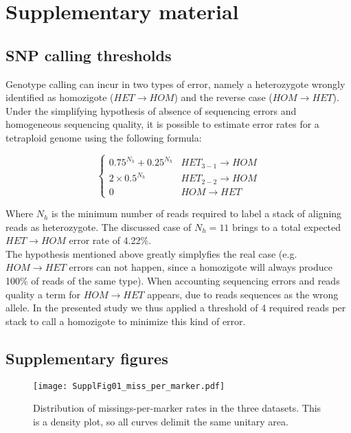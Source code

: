 \section{Supplementary material}
\label{sec:supplementary_material}

\subsection{SNP calling thresholds}
\label{sec:SNP_calling_thresholds}
Genotype calling can incur in two types of error, namely a heterozygote wrongly identified as homozigote ($HET \rightarrow HOM$) and the reverse case ($HOM \rightarrow HET$). 
Under the simplifying hypothesis of absence of sequencing errors and homogeneous sequencing quality, it is possible to estimate error rates for a tetraploid genome using the following formula:

\begin{equation}
\begin{cases}
0.75^{N_h} + 0.25^{N_h} & HET_{3-1} \rightarrow HOM \\ 
2 \times 0.5^{N_h}      & HET_{2-2} \rightarrow HOM \\ 
0                       & HOM \rightarrow HET
\end{cases}
\end{equation}

Where $N_h$ is the minimum number of reads required to label a stack of aligning reads as heterozygote. The discussed case of $N_h = 11$ brings to a total expected $HET \rightarrow HOM$ error rate of 4.22\%.\\
The hypothesis mentioned above greatly simplyfies the real case (e.g. $HOM \rightarrow HET$ errors can not happen, since a homozigote will always produce 100\% of reads of the same type). When accounting sequencing errors and reads quality a term for $HOM \rightarrow HET$ appears, due to reads sequences as the wrong allele. In the presented study we thus applied a threshold of 4 required reads per stack to call a homozigote to minimize this kind of error.

\subsection{Supplementary figures}
\label{sec:supplementary_figures}

\begin{figure}\texttt{[image: SupplFig01\_miss\_per\_marker.pdf]}
\caption{Distribution of missings-per-marker rates in the three datasets. This is a
density plot, so all curves delimit the same unitary area.}
\end{figure}

